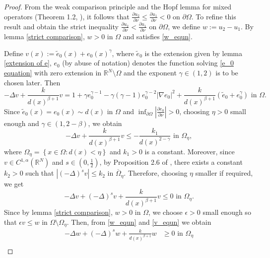 \documentclass[reqno,oneside]{amsart}
\theoremstyle{definition}
\theoremstyle{remark}
\numberwithin{equation}{section}
\newcommand{\ba}{\beta}
\newcommand{\Om} {\Omega}
\newcommand{\pa}{\partial}
\newcommand{\sr}{\mathbb{R}}
\newcommand{\na} {\nabla}
\newcommand{\De} {\Delta}
\newcommand{\et}{\tilde{e}_0}
\begin{document}
\begin{proof}
    From the weak comparison principle and the Hopf lemma for mixed operators (Theorem 1.2, \cite{antonini2025global}), it follows that $\frac{\pa u_2}{\pa\nu} \leq \frac{\pa u_1}{\pa\nu} < 0$ on $\pa\Om$. To refine this result and obtain the strict inequality $\frac{\pa u_2}{\pa\nu} < \frac{\pa u_1}{\pa\nu}$ on $\pa\Om$, we define $w:= u_2 - u_1$. By lemma \ref{strict comparison}, $w > 0$ in $\Om$ and satisfies \eqref{w_equn}.

    Define $v(x):= \et (x) + e_0 (x)^{\gamma}$, where $\et$ is the extension given by lemma \ref{extension of e}, $e_0$ (by abuse of notation) denotes the function solving \eqref{e_0 equation} with zero extension in $\sr^N \setminus \Om$ and the exponent $\gamma\in (1,2)$ is to be chosen later. Then
    \begin{equation}\label{direct computation}
        -\Delta v + \frac{k}{d(x)^{\ba +1}} v = 1 + \gamma e_0^{\gamma -1} -\gamma (\gamma -1) e_0^{\gamma -2} |\na e_0|^2 + \frac{k}{d(x)^{\ba +1}} \left(\et + e_0^{\gamma}\right) \text{ in } \Om.
    \end{equation}
    Since $\et (x) = e_0 (x) \sim d(x)$ in $\Om$ and $\inf_{\pa\Om} \left| \frac{\pa e_0}{\pa\nu} \right| >0$, choosing $\eta>0$ small enough and $\gamma \in (1, 2- \ba)$, we obtain
    \begin{equation}\label{est_k1}
        -\Delta v + \frac{k}{d(x)^{\ba +1}} v \leq - \frac{k_1}{d(x)^{2-\gamma}} \text{ in } \Om_{\eta},
    \end{equation}
    where $\Om_{\eta} = \left\{ x\in \Om : d(x) < \eta \right\}$ and $k_1 >0$ is a constant. Moreover, since $v \in C^{1,\alpha} (\sr^N)$ and $s\in \left(0, \frac{1}{2}\right)$, by Proposition 2.6 of \cite{silvestre2007regularity}, there exists a constant $k_2 >0$ such that $\left|(-\De)^s v\right| \leq k_2$ in $\overline{\Om}_{\eta}$. Therefore, choosing $\eta$ smaller if required, we get
    \begin{equation}\label{v_equn}
        -\Delta v + (-\De)^s v + \frac{k}{d(x)^{\ba +1}} v \leq 0 \text{ in } \Om_{\eta}.
    \end{equation}
    Since by lemma \ref{strict comparison}, $w >0$ in $\Om$, we choose $\epsilon>0$ small enough so that $\epsilon v \leq w$ in $\Om \setminus \Om_{\eta}$. Then, from \eqref{w_equn} and \eqref{v_equn} we obtain
    \begin{equation}
        \begin{aligned}
            -\Delta w + (-\De)^s w + \frac{k}{d(x)^{\ba +1}} w &\geq 0 \text{ in } \Om_{\eta}\\

\end{aligned}
\end{equation}
\end{proof}
\end{document}
